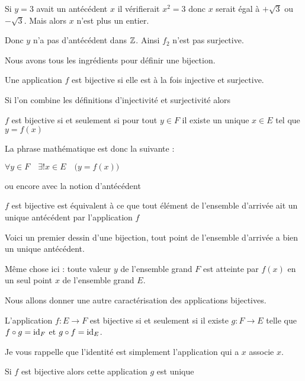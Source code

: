Si $y=3$ avait un antécédent $x$ il vérifierait $x^2=3$ donc 
$x$ serait égal à $+\sqrt3$ ou $-\sqrt3$. Mais alors $x$ n'est plus un entier.

Donc $y$ n'a pas d'antécédent dans $\mathbb{Z}$. Ainsi $f_2$ n'est pas surjective.


\diapo

Nous avons tous les ingrédients pour définir une bijection.

Une application $f$ est bijective si elle est à la fois injective et surjective.

\change

Si l'on combine les définitions d'injectivité et surjectivité alors

$f$ est bijective si et seulement si 
pour tout $y \in F$ il existe un unique $x \in E$ tel que $y=f(x)$


\change

La phrase mathématique est donc la suivante :

$\forall y \in F \quad \exists! x \in E \quad \big( y = f(x) \big)$

\change

ou encore avec la notion d'antécédent

$f$ est bijective est équivalent à ce que 
 tout élément de l'ensemble d'arrivée ait un unique antécédent par l'application $f$

\change

Voici un premier dessin d'une bijection, tout point de l'ensemble d'arrivée a 
bien un unique antécédent.

\change

Même chose ici : toute valeur $y$ de l'ensemble grand $F$ est atteinte
par $f(x)$ en un seul point $x$ de l'ensemble grand $E$. 



\diapo

Nous allons donner une autre caractérisation des applications bijectives.

\change

L'application $f : E \to F$ est bijective si et seulement si il existe $g : F \to E$
telle que $f \circ g = \mathop{\text{id}}\nolimits_F$ et $g \circ f = \mathop{\text{id}}\nolimits_E$.


Je vous rappelle que l'identité est simplement l'application qui a $x$ associe $x$.


\change

Si $f$ est bijective alors cette application $g$ est unique 

